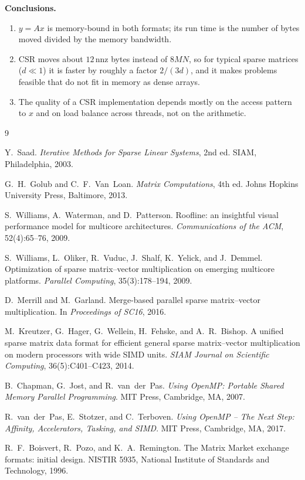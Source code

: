 \documentclass[11pt,a4paper]{article}
\newcommand{\nnz}{\mathrm{nnz}}
\begin{document}
\noindent\textbf{Conclusions.}
\begin{enumerate}
  \item $y = Ax$ is memory-bound in both formats; its run time is the number
        of bytes moved divided by the memory bandwidth.
  \item CSR moves about $12\,\nnz$ bytes instead of $8MN$, so for typical
        sparse matrices ($d \ll 1$) it is faster by roughly a factor
        $2/(3d)$, and it makes problems feasible that do not fit in memory
        as dense arrays.
  \item The quality of a CSR implementation depends mostly on the access
        pattern to $x$ and on load balance across threads, not on the
        arithmetic.
\end{enumerate}

\begin{thebibliography}{9}

Y.~Saad.
\newblock \emph{Iterative Methods for Sparse Linear Systems}, 2nd ed.
\newblock SIAM, Philadelphia, 2003.

G.~H.~Golub and C.~F.~Van~Loan.
\newblock \emph{Matrix Computations}, 4th ed.
\newblock Johns Hopkins University Press, Baltimore, 2013.

S.~Williams, A.~Waterman, and D.~Patterson.
\newblock Roofline: an insightful visual performance model for multicore
architectures.
\newblock \emph{Communications of the ACM}, 52(4):65--76, 2009.

S.~Williams, L.~Oliker, R.~Vuduc, J.~Shalf, K.~Yelick, and J.~Demmel.
\newblock Optimization of sparse matrix--vector multiplication on emerging
multicore platforms.
\newblock \emph{Parallel Computing}, 35(3):178--194, 2009.

D.~Merrill and M.~Garland.
\newblock Merge-based parallel sparse matrix--vector multiplication.
\newblock In \emph{Proceedings of SC16}, 2016.

M.~Kreutzer, G.~Hager, G.~Wellein, H.~Fehske, and A.~R.~Bishop.
\newblock A unified sparse matrix data format for efficient general sparse
matrix--vector multiplication on modern processors with wide SIMD units.
\newblock \emph{SIAM Journal on Scientific Computing}, 36(5):C401--C423, 2014.

B.~Chapman, G.~Jost, and R.~van~der~Pas.
\newblock \emph{Using OpenMP: Portable Shared Memory Parallel Programming}.
\newblock MIT Press, Cambridge, MA, 2007.

R.~van~der~Pas, E.~Stotzer, and C.~Terboven.
\newblock \emph{Using OpenMP -- The Next Step: Affinity, Accelerators,
Tasking, and SIMD}.
\newblock MIT Press, Cambridge, MA, 2017.

R.~F.~Boisvert, R.~Pozo, and K.~A.~Remington.
\newblock The Matrix Market exchange formats: initial design.
\newblock NISTIR 5935, National Institute of Standards and Technology, 1996.

\end{thebibliography}
\end{document}
